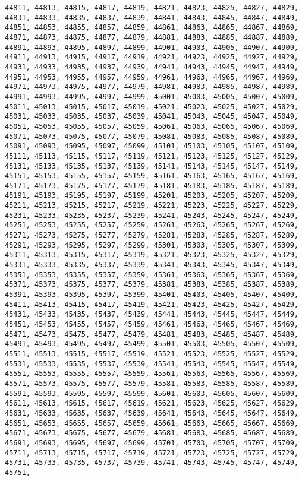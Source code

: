\documentclass[11pt]{article}
\begin{document}
\begin{Verbatim}[commandchars=\\\{\}]
44811, 44813, 44815, 44817, 44819, 44821, 44823, 44825, 44827, 44829, 44831, 44833, 44835, 44837, 44839, 44841, 44843, 44845, 44847, 44849, 44851, 44853, 44855, 44857, 44859, 44861, 44863, 44865, 44867, 44869, 44871, 44873, 44875, 44877, 44879, 44881, 44883, 44885, 44887, 44889, 44891, 44893, 44895, 44897, 44899, 44901, 44903, 44905, 44907, 44909, 44911, 44913, 44915, 44917, 44919, 44921, 44923, 44925, 44927, 44929, 44931, 44933, 44935, 44937, 44939, 44941, 44943, 44945, 44947, 44949, 44951, 44953, 44955, 44957, 44959, 44961, 44963, 44965, 44967, 44969, 44971, 44973, 44975, 44977, 44979, 44981, 44983, 44985, 44987, 44989, 44991, 44993, 44995, 44997, 44999, 45001, 45003, 45005, 45007, 45009, 45011, 45013, 45015, 45017, 45019, 45021, 45023, 45025, 45027, 45029, 45031, 45033, 45035, 45037, 45039, 45041, 45043, 45045, 45047, 45049, 45051, 45053, 45055, 45057, 45059, 45061, 45063, 45065, 45067, 45069, 45071, 45073, 45075, 45077, 45079, 45081, 45083, 45085, 45087, 45089, 45091, 45093, 45095, 45097, 45099, 45101, 45103, 45105, 45107, 45109, 45111, 45113, 45115, 45117, 45119, 45121, 45123, 45125, 45127, 45129, 45131, 45133, 45135, 45137, 45139, 45141, 45143, 45145, 45147, 45149, 45151, 45153, 45155, 45157, 45159, 45161, 45163, 45165, 45167, 45169, 45171, 45173, 45175, 45177, 45179, 45181, 45183, 45185, 45187, 45189, 45191, 45193, 45195, 45197, 45199, 45201, 45203, 45205, 45207, 45209, 45211, 45213, 45215, 45217, 45219, 45221, 45223, 45225, 45227, 45229, 45231, 45233, 45235, 45237, 45239, 45241, 45243, 45245, 45247, 45249, 45251, 45253, 45255, 45257, 45259, 45261, 45263, 45265, 45267, 45269, 45271, 45273, 45275, 45277, 45279, 45281, 45283, 45285, 45287, 45289, 45291, 45293, 45295, 45297, 45299, 45301, 45303, 45305, 45307, 45309, 45311, 45313, 45315, 45317, 45319, 45321, 45323, 45325, 45327, 45329, 45331, 45333, 45335, 45337, 45339, 45341, 45343, 45345, 45347, 45349, 45351, 45353, 45355, 45357, 45359, 45361, 45363, 45365, 45367, 45369, 45371, 45373, 45375, 45377, 45379, 45381, 45383, 45385, 45387, 45389, 45391, 45393, 45395, 45397, 45399, 45401, 45403, 45405, 45407, 45409, 45411, 45413, 45415, 45417, 45419, 45421, 45423, 45425, 45427, 45429, 45431, 45433, 45435, 45437, 45439, 45441, 45443, 45445, 45447, 45449, 45451, 45453, 45455, 45457, 45459, 45461, 45463, 45465, 45467, 45469, 45471, 45473, 45475, 45477, 45479, 45481, 45483, 45485, 45487, 45489, 45491, 45493, 45495, 45497, 45499, 45501, 45503, 45505, 45507, 45509, 45511, 45513, 45515, 45517, 45519, 45521, 45523, 45525, 45527, 45529, 45531, 45533, 45535, 45537, 45539, 45541, 45543, 45545, 45547, 45549, 45551, 45553, 45555, 45557, 45559, 45561, 45563, 45565, 45567, 45569, 45571, 45573, 45575, 45577, 45579, 45581, 45583, 45585, 45587, 45589, 45591, 45593, 45595, 45597, 45599, 45601, 45603, 45605, 45607, 45609, 45611, 45613, 45615, 45617, 45619, 45621, 45623, 45625, 45627, 45629, 45631, 45633, 45635, 45637, 45639, 45641, 45643, 45645, 45647, 45649, 45651, 45653, 45655, 45657, 45659, 45661, 45663, 45665, 45667, 45669, 45671, 45673, 45675, 45677, 45679, 45681, 45683, 45685, 45687, 45689, 45691, 45693, 45695, 45697, 45699, 45701, 45703, 45705, 45707, 45709, 45711, 45713, 45715, 45717, 45719, 45721, 45723, 45725, 45727, 45729, 45731, 45733, 45735, 45737, 45739, 45741, 45743, 45745, 45747, 45749, 45751, 
\end{Verbatim}
\end{document}
